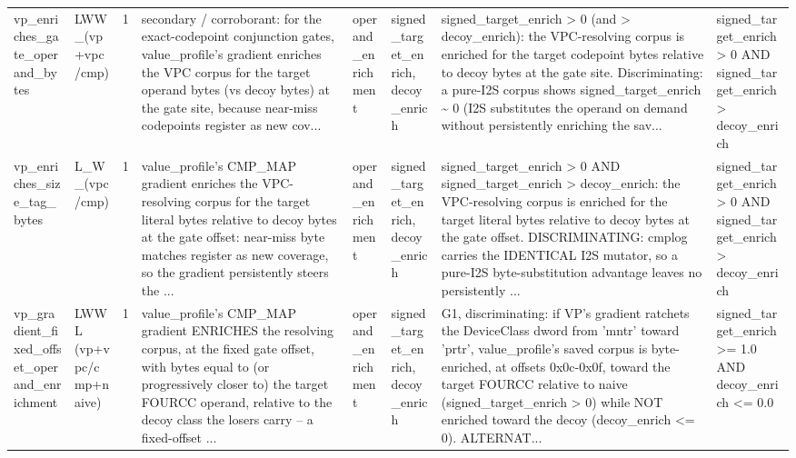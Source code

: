 \documentclass[7pt]{extarticle}
\begin{document}
{\begin{longtable}{@{}p{2.4cm}p{1.9cm}rp{4.3cm}p{1.5cm}p{1.7cm}p{4.6cm}p{3.0cm}@{}}
vp\_\allowbreak enriches\_\allowbreak gate\_\allowbreak operand\_\allowbreak bytes & LWW\_\allowbreak  (vp+vpc/cmp) & 1 & secondary / corroborant: for the exact-codepoint conjunction gates, value\_\allowbreak profile's gradient enriches the VPC corpus for the target operand bytes (vs decoy bytes) at the gate site, because near-miss codepoints register as new cov... & operand\_\allowbreak enrichment & signed\_\allowbreak target\_\allowbreak enrich, decoy\_\allowbreak enrich & signed\_\allowbreak target\_\allowbreak enrich \textgreater{} 0 (and \textgreater{} decoy\_\allowbreak enrich): the VPC-resolving corpus is enriched for the target codepoint bytes relative to decoy bytes at the gate site. Discriminating: a pure-I2S corpus shows signed\_\allowbreak target\_\allowbreak enrich \textasciitilde{} 0 (I2S substitutes the operand on demand without persistently enriching the sav... & signed\_\allowbreak target\_\allowbreak enrich \textgreater{} 0 AND signed\_\allowbreak target\_\allowbreak enrich \textgreater{} decoy\_\allowbreak enrich\\
vp\_\allowbreak enriches\_\allowbreak size\_\allowbreak tag\_\allowbreak bytes & L\_\allowbreak W\_\allowbreak  (vpc/cmp) & 1 & value\_\allowbreak profile's CMP\_\allowbreak MAP gradient enriches the VPC-resolving corpus for the target literal bytes relative to decoy bytes at the gate offset: near-miss byte matches register as new coverage, so the gradient persistently steers the ... & operand\_\allowbreak enrichment & signed\_\allowbreak target\_\allowbreak enrich, decoy\_\allowbreak enrich & signed\_\allowbreak target\_\allowbreak enrich \textgreater{} 0 AND signed\_\allowbreak target\_\allowbreak enrich \textgreater{} decoy\_\allowbreak enrich: the VPC-resolving corpus is enriched for the target literal bytes relative to decoy bytes at the gate offset. DISCRIMINATING: cmplog carries the IDENTICAL I2S mutator, so a pure-I2S byte-substitution advantage leaves no persistently ... & signed\_\allowbreak target\_\allowbreak enrich \textgreater{} 0 AND signed\_\allowbreak target\_\allowbreak enrich \textgreater{} decoy\_\allowbreak enrich\\
vp\_\allowbreak gradient\_\allowbreak fixed\_\allowbreak offset\_\allowbreak operand\_\allowbreak enrichment & LWWL (vp+vpc/cmp+naive) & 1 & value\_\allowbreak profile's CMP\_\allowbreak MAP gradient ENRICHES the resolving corpus, at the fixed gate offset, with bytes equal to (or progressively closer to) the target FOURCC operand, relative to the decoy class the losers carry -- a fixed-offset ... & operand\_\allowbreak enrichment & signed\_\allowbreak target\_\allowbreak enrich, decoy\_\allowbreak enrich & G1, discriminating: if VP's gradient ratchets the DeviceClass dword from 'mntr' toward 'prtr', value\_\allowbreak profile's saved corpus is byte-enriched, at offsets 0x0c-0x0f, toward the target FOURCC relative to naive (signed\_\allowbreak target\_\allowbreak enrich \textgreater{} 0) while NOT enriched toward the decoy (decoy\_\allowbreak enrich \textless{}= 0). ALTERNAT... & signed\_\allowbreak target\_\allowbreak enrich \textgreater{}= 1.0 AND decoy\_\allowbreak enrich \textless{}= 0.0\\

\end{longtable}}
\end{document}
